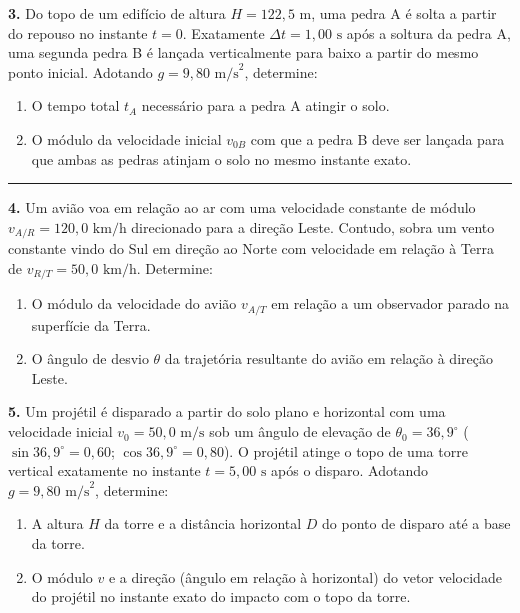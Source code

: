 \documentclass[10pt,a4paper]{article}
\begin{document}
\vfill

\newpage

\noindent\textbf{3.} Do topo de um edifício de altura $H = 122,5\text{ m}$, uma pedra A é solta a partir do repouso no instante $t = 0$. Exatamente $\Delta t = 1,00\text{ s}$ após a soltura da pedra A, uma segunda pedra B é lançada verticalmente para baixo a partir do mesmo ponto inicial. Adotando $g = 9,80\text{ m/s}^2$, determine:
\begin{enumerate}[label=\alph*),itemsep=2pt,topsep=3pt]
    \item O tempo total $t_A$ necessário para a pedra A atingir o solo.
    \item O módulo da velocidade inicial $v_{0B}$ com que a pedra B deve ser lançada para que ambas as pedras atinjam o solo no mesmo instante exato.
\end{enumerate}

\vfill
\hrule
\vspace{4mm}

\noindent\textbf{4.} Um avião voa em relação ao ar com uma velocidade constante de módulo $v_{A/R} = 120,0\text{ km/h}$ direcionado para a direção Leste. Contudo, sobra um vento constante vindo do Sul em direção ao Norte com velocidade em relação à Terra de $v_{R/T} = 50,0\text{ km/h}$. Determine:
\begin{enumerate}[label=\alph*),itemsep=2pt,topsep=3pt]
    \item O módulo da velocidade do avião $v_{A/T}$ em relação a um observador parado na superfície da Terra.
    \item O ângulo de desvio $\theta$ da trajetória resultante do avião em relação à direção Leste.
\end{enumerate}

\vfill

\newpage

\noindent\textbf{5.} Um projétil é disparado a partir do solo plano e horizontal com uma velocidade inicial $v_0 = 50,0\text{ m/s}$ sob um ângulo de elevação de $\theta_0 = 36,9^\circ$ ($\sin 36,9^\circ = 0,60$; $\cos 36,9^\circ = 0,80$). O projétil atinge o topo de uma torre vertical exatamente no instante $t = 5,00\text{ s}$ após o disparo. Adotando $g = 9,80\text{ m/s}^2$, determine:
\begin{enumerate}[label=\alph*),itemsep=2pt,topsep=3pt]
    \item A altura $H$ da torre e a distância horizontal $D$ do ponto de disparo até a base da torre.
    \item O módulo $v$ e a direção (ângulo em relação à horizontal) do vetor velocidade do projétil no instante exato do impacto com o topo da torre.
\end{enumerate}

\vfill
\end{document}

